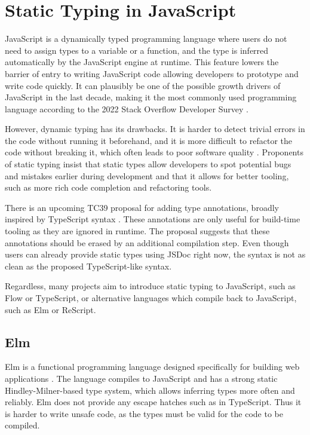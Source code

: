 \section{Static Typing in JavaScript}

JavaScript is a dynamically typed programming language where users do not need to assign types to a variable or a function, and the type is inferred automatically by the JavaScript engine at runtime. This feature lowers the barrier of entry to writing JavaScript code allowing developers to prototype and write code quickly. It can plausibly be one of the possible growth drivers of JavaScript in the last decade, making it the most commonly used programming language according to the 2022 Stack Overflow Developer Survey \cite{StackOverflowDeveloper}.

However, dynamic typing has its drawbacks. It is harder to detect trivial errors in the code without running it beforehand, and it is more difficult to refactor the code without breaking it, which often leads to poor software quality \cite{fardJSNOSEDetectingJavaScript2013a}. Proponents of static typing insist that static types allow developers to spot potential bugs and mistakes earlier during development and that it allows for better tooling, such as more rich code completion and refactoring tools.

There is an upcoming TC39 proposal for adding type annotations, broadly inspired by TypeScript syntax \cite{ECMAScriptProposalType2023}. These annotations are only useful for build-time tooling as they are ignored in runtime. The proposal suggests that these annotations should be erased by an additional compilation step. Even though users can already provide static types using JSDoc right now, the syntax is not as clean as the proposed TypeScript-like syntax.

Regardless, many projects aim to introduce static typing to JavaScript, such as Flow or TypeScript, or alternative languages which compile back to JavaScript, such as Elm or ReScript.

\subsection{Elm}

Elm is a functional programming language designed specifically for building web applications \cite{ElmDelightfulLanguage}. The language compiles to JavaScript and has a strong static Hindley-Milner-based type system, which allows inferring types more often and reliably. Elm does not provide any escape hatches such as  in TypeScript. Thus it is harder to write unsafe code, as the types must be valid for the code to be compiled.

